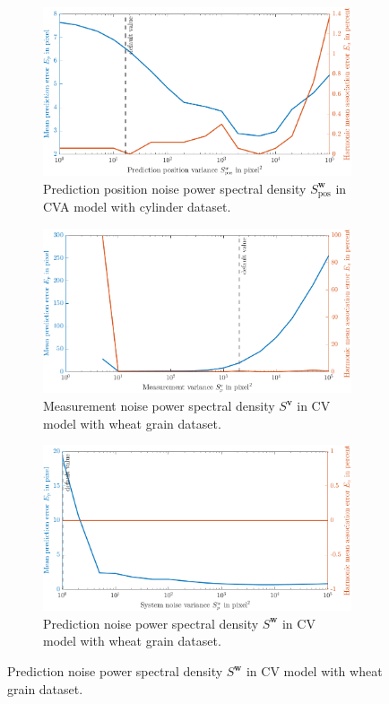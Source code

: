 \begin{figure}
    \ContinuedFloat
    \centering
	\begin{subfigure}[t]{0.8\textwidth}
		\includegraphics[width=\textwidth]{figures/KF/appendix/c cva precov.png}
		\caption{Prediction position noise power spectral density     $S_{\mathrm{pos}}^{\boldsymbol{w}}$ in CVA model with cylinder dataset.}
	\end{subfigure}
		\begin{subfigure}[t]{0.8\textwidth}
		\includegraphics[width=\textwidth]{figures/KF/appendix/w cv meacov.png}
		\caption{Measurement noise power spectral density     $S^{\boldsymbol{v}}$ in CV model with wheat grain dataset.}
	\end{subfigure}
	\begin{subfigure}[t]{0.8\textwidth}
		\includegraphics[width=\textwidth]{figures/KF/appendix/w cv precov.png}
		\caption{Prediction noise power spectral density     $S^{\boldsymbol{w}}$ in CV model with wheat grain dataset.}
	\end{subfigure}
\end{figure}

